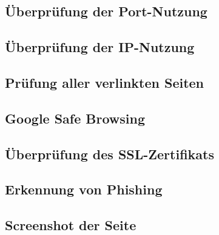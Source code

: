 \subsection{Überprüfung der Port-Nutzung}


\subsection{Überprüfung der IP-Nutzung}


\subsection{Prüfung aller verlinkten Seiten}


\subsection{Google Safe Browsing}


\subsection{Überprüfung des SSL-Zertifikats}


\subsection{Erkennung von Phishing}


\subsection{Screenshot der Seite}


